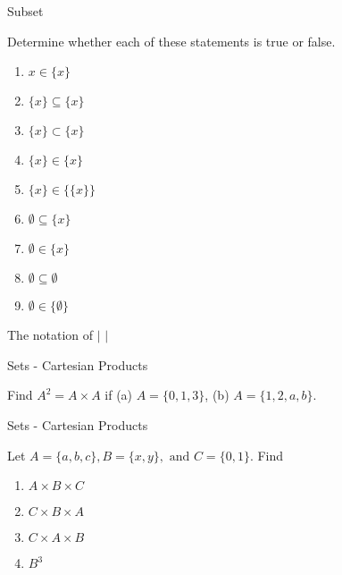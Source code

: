\documentclass{beamer}
\begin{document}
\begin{frame}{Subset}
    \begin{example}
        Determine whether each of these statements is true or false.
        \begin{enumerate}
            \item $x \in \{x\}$
            \item $\{x\} \subseteq \{x\}$
            \item $\{x\} \subset \{x\}$
            \item $\{x\} \in \{x\}$
            \item $\{x\} \in \{\{x\}\}$
            \item $\emptyset \subseteq \{x\}$
            \item $\emptyset \in \{x\}$
            \item $\emptyset \subseteq \emptyset$
            \item $\emptyset \in \{\emptyset\}$
        \end{enumerate}
    \end{example}
\end{frame}

\begin{frame}{The notation of $|$  $|$}
\end{frame}

\begin{frame}[t]{Sets - Cartesian Products}
    \begin{example}
        Find $A^2 = A \times A$ if (a) $A = \{0,1,3\}$, (b) $A = \{1,2,a,b\}$.
    \end{example}
\end{frame}

\begin{frame}[t]{Sets - Cartesian Products}
    \begin{example}
        Let $A = \{a,b,c\}, B = \{x,y\}, \text{ and } C = \{0,1\}$. Find 
        \begin{enumerate}
            \item $A \times B \times C$
            \item $C \times B \times A$
            \item $C \times A \times B$
            \item $B^3$
        \end{enumerate}
    \end{example}
\end{frame}
\end{document}
